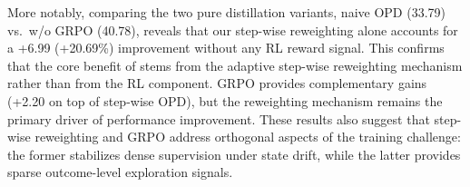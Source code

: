 More notably, comparing the two pure distillation variants, naive OPD (33.79) vs.\ \ourmodel w/o GRPO (40.78), reveals that our step-wise reweighting alone accounts for a +6.99 (+20.69\%) improvement without any RL reward signal. This confirms that the core benefit of \ourmodel stems from the adaptive step-wise reweighting mechanism rather than from the RL component. GRPO provides complementary gains (+2.20 on top of step-wise OPD), but the reweighting mechanism remains the primary driver of performance improvement. These results also suggest that step-wise reweighting and GRPO address orthogonal aspects of the training challenge: the former stabilizes dense supervision under state drift, while the latter provides sparse outcome-level exploration signals.
